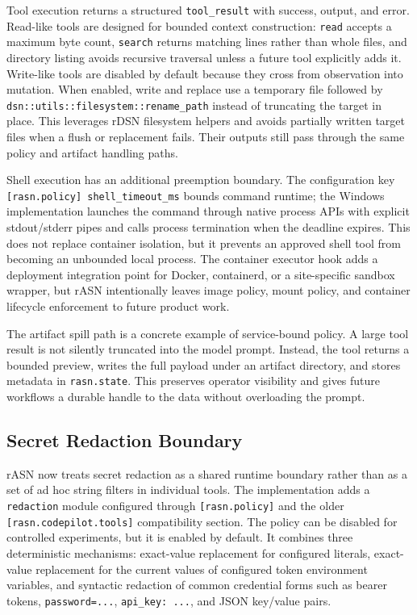 \documentclass[manuscript,screen,review]{acmart}
\newcommand{\rasn}{rASN\xspace}
\begin{document}
Tool execution returns a structured \texttt{tool\_result} with success, output,
and error. Read-like tools are designed for bounded context construction:
\texttt{read} accepts a maximum byte count, \texttt{search} returns matching
lines rather than whole files, and directory listing avoids recursive traversal
unless a future tool explicitly adds it. Write-like tools are disabled by
default because they cross from observation into mutation. When enabled, write
and replace use a temporary file followed by
\texttt{dsn::utils::filesystem::rename\_path} instead of truncating the target
in place. This leverages rDSN filesystem helpers and avoids partially written
target files when a flush or replacement fails. Their outputs still pass through
the same policy and artifact handling paths.

Shell execution has an additional preemption boundary. The configuration key
\texttt{[rasn.policy] shell\_timeout\_ms} bounds command runtime; the Windows
implementation launches the command through native process APIs with explicit
stdout/stderr pipes and calls process termination when the deadline expires.
This does not replace container isolation, but it prevents an approved shell
tool from becoming an unbounded local process. The container executor hook adds
a deployment integration point for Docker, containerd, or a site-specific
sandbox wrapper, but rASN intentionally leaves image policy, mount policy, and
container lifecycle enforcement to future product work.

The artifact spill path is a concrete example of service-bound policy. A large
tool result is not silently truncated into the model prompt. Instead, the tool
returns a bounded preview, writes the full payload under an artifact directory,
and stores metadata in \texttt{rasn.state}. This preserves operator visibility
and gives future workflows a durable handle to the data without overloading the
prompt.

\subsection{Secret Redaction Boundary}

\rasn now treats secret redaction as a shared runtime boundary rather than as a
set of ad hoc string filters in individual tools. The implementation adds a
\texttt{redaction} module configured through \texttt{[rasn.policy]} and the
older \texttt{[rasn.codepilot.tools]} compatibility section. The policy can be
disabled for controlled experiments, but it is enabled by default. It combines
three deterministic mechanisms: exact-value replacement for configured literals,
exact-value replacement for the current values of configured token environment
variables, and syntactic redaction of common credential forms such as bearer
tokens, \texttt{password=...}, \texttt{api\_key: ...}, and JSON key/value
pairs.
\end{document}
